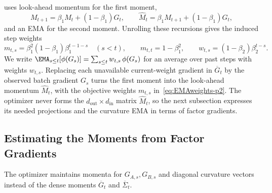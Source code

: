  uses look-ahead momentum for the first moment,
\[
  M_{t+1}=\beta_1M_t+(1-\beta_1)G_t,
  \qquad
  \widehat M_t=\beta_1M_{t+1}+(1-\beta_1)G_t,
\]
and an EMA for the second moment. Unrolling these recursions
gives the induced step weights
\begin{equation}\label{eq:EMAweights-p2}
  m_{t,s}=\beta_1^2(1-\beta_1)\beta_1^{t-1-s}
  \quad(s<t),
  \qquad
  m_{t,t}=1-\beta_1^2,
  \qquad
  w_{t,s}=(1-\beta_2)\beta_2^{t-s}.
\end{equation}
We write $\EMA_{s\le t}[\phi(G_s)]=\sum_{s\le t}w_{t,s}\,\phi(G_s)$ for an
average over past steps with weights $w_{t,s}$. Replacing each unavailable
current-weight gradient in $\overline G_t$ by the observed batch gradient
$G_s$ turns the first moment into the look-ahead momentum $\widehat M_t$,
with the objective weights $m_{t,s}$ in~\eqref{eq:EMAweights-p2}. The
optimizer never forms the $d_{\mathrm{out}}\times d_{\mathrm{in}}$ matrix
$\widehat M_t$, so the next subsection expresses its needed projections and
the curvature EMA in terms of factor gradients.

\subsection{Estimating the Moments from Factor Gradients}
\label{sec:weighted-estimation-p2}

The optimizer maintains momenta for $G_{A,s},G_{B,s}$ and diagonal
curvature vectors instead of the dense moments $\overline G_t$ and
$\overline\Sigma_t$.

